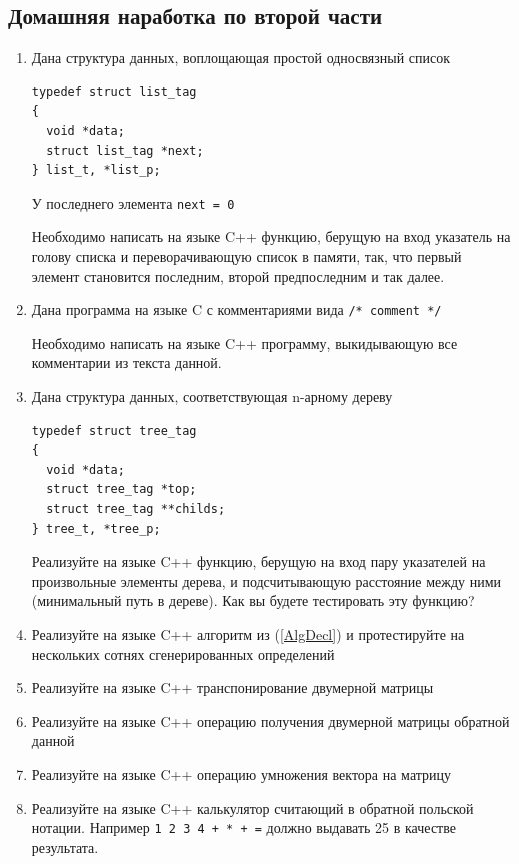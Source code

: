 \documentclass[a4paper,12pt,oneside]{article}
\begin{document}
\subsection{Домашняя наработка по второй части}
\begin{enumerate}
\item
Дана структура данных, воплощающая простой односвязный список

\begin{lstlisting}
typedef struct list_tag
{
  void *data;
  struct list_tag *next;
} list_t, *list_p;
\end{lstlisting}

У последнего элемента \lstinline!next = 0!

Необходимо написать на языке C++ функцию, берущую на вход указатель на голову списка и переворачивающую список в памяти, так, что первый элемент становится последним, второй предпоследним и так далее.

\item
Дана программа на языке C с комментариями вида \lstinline!/* comment */!

Необходимо написать на языке C++ программу, выкидывающую все комментарии из текста данной.

\item
Дана структура данных, соответствующая n-арному дереву

\begin{lstlisting}
typedef struct tree_tag
{
  void *data;
  struct tree_tag *top;
  struct tree_tag **childs;
} tree_t, *tree_p;
\end{lstlisting}

Реализуйте на языке C++ функцию, берущую на вход пару указателей на произвольные элементы дерева, и подсчитывающую расстояние между ними (минимальный путь в дереве). Как вы будете тестировать эту функцию?

\item
Реализуйте на языке C++ алгоритм из (\ref{AlgDecl}) и протестируйте на нескольких сотнях сгенерированных определений

\item
Реализуйте на языке C++ транспонирование двумерной матрицы

\item
Реализуйте на языке C++ операцию получения двумерной матрицы обратной данной

\item
Реализуйте на языке C++ операцию умножения вектора на матрицу

\item
Реализуйте на языке C++ калькулятор считающий в обратной польской нотации. Например \lstinline!1 2 3 4 + * + =! должно выдавать 25 в качестве результата.


\end{enumerate}
\end{document}
